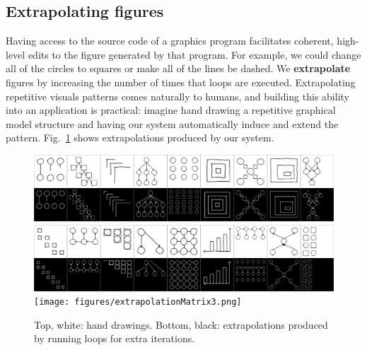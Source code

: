 \documentclass{article}
\newcommand{\remark}[1]{\textcolor{red}{[#1]}}
\theoremstyle{definition}
\begin{document}
\subsection{Extrapolating figures}
Having access to the source code of a graphics program facilitates coherent, high-level edits to the figure generated by that program. 
For example,
we could change all of the circles to squares or make all of the lines be dashed.
We \textbf{extrapolate} figures
by increasing the number of times that loops are executed.
Extrapolating repetitive visuals patterns comes naturally to humans,
and building this ability into an application is practical:
imagine hand drawing a repetitive graphical model structure
and having our system automatically induce and extend the pattern.
Fig.~\ref{extrapolationFigure} shows extrapolations produced by our system.
\begin{figure}[H]
  \includegraphics[width = \textwidth]{figures/extrapolationMatrix1.png}
  \includegraphics[width = \textwidth]{figures/extrapolationMatrix2.png}
  \texttt{[image: figures/extrapolationMatrix3.png]}  
  \caption{Top, white: hand drawings. Bottom, black: extrapolations produced by
running loops for extra iterations.}\label{extrapolationFigure}
  \end{figure}
%



\end{document}
